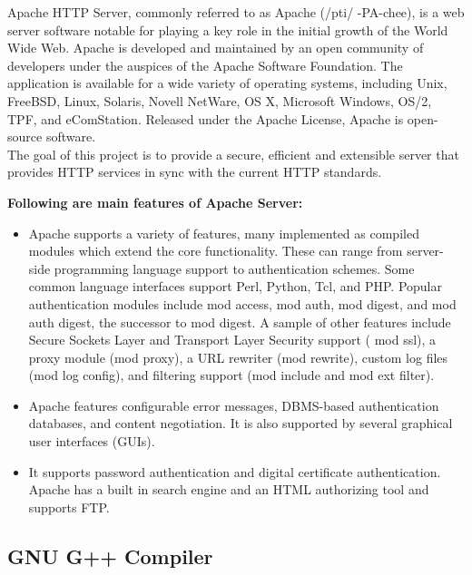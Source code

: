 Apache HTTP Server, commonly referred to as Apache (/pti/
-PA-chee), is a web server
software notable for playing a key role in the initial growth of the
World Wide Web. Apache is
developed and maintained by an open community of developers under the
auspices of the Apache
Software Foundation. The application is available for a wide variety
of operating systems, including
Unix, FreeBSD, Linux, Solaris, Novell NetWare, OS X, Microsoft
Windows, OS/2, TPF, and
eComStation. Released under the Apache License, Apache is open-source
software.\\
The goal of this project is to provide a secure, efficient and
extensible server that provides
HTTP services in sync with the current HTTP standards.

{\bf Following are main features of Apache Server:}

\begin{itemize}

\item Apache supports a variety of features, many implemented as compiled
modules which extend
the core functionality. These can range from server-side programming
language support
to authentication schemes. Some common language interfaces support
Perl, Python, Tcl,
and PHP. Popular authentication modules include mod access, mod auth,
mod digest,
and mod auth digest, the successor to mod digest. A sample of other
features include
Secure Sockets Layer and Transport Layer Security support ( mod ssl),
a proxy module
(mod proxy), a URL rewriter (mod rewrite), custom log files (mod log
config), and filtering
support (mod include and mod ext filter).
\item Apache features configurable error messages, DBMS-based
authentication databases, and
content negotiation. It is also supported by several graphical user
interfaces (GUIs).
\item It supports password authentication and digital certificate
authentication. Apache has a
built in search engine and an HTML authorizing tool and supports FTP.

\end{itemize}

\newpage

\subsection{GNU G++ Compiler}

